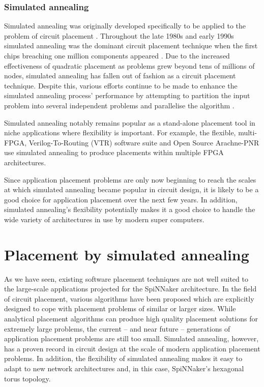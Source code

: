 			
			\subsubsection{Simulated annealing}
				
				Simulated annealing was originally developed specifically to be applied
				to the problem of circuit placement \cite{kirkpatrick83}. Throughout
				the late 1980s and early 1990s simulated annealing was the dominant
				circuit placement technique when the first chips breaching one million
				components appeared \cite{betz97,sechen85}. Due to the increased
				effectiveness of quadratic placement as problems grew beyond tens of
				millions of nodes, simulated annealing has fallen out of fashion as a
				circuit placement technique. Despite this, various efforts continue to
				be made to enhance the simulated annealing process' performance by
				attempting to partition the input problem into several independent
				problems \cite{choong10,haldar00} and parallelise the algorithm
				\cite{ludwin08}.
				
				Simulated annealing notably remains popular as a stand-alone placement
				tool in niche applications where flexibility is important. For example,
				the flexible, multi-FPGA, Verilog-To-Routing (VTR) software suite
				\cite{luu14} and Open Source Arachne-PNR \cite{cseed} use simulated
				annealing to produce placements within multiple FPGA architectures.
				
				Since application placement problems are only now beginning to reach
				the scales at which simulated annealing became popular in circuit
				design, it is likely to be a good choice for application placement over
				the next few years. In addition, simulated annealing's flexibility
				potentially makes it a good choice to handle the wide variety of
				architectures in use by modern super computers.
	
	\section{Placement by simulated annealing}
		
		\label{sec:placement-by-annealing}	
		
		As we have seen, existing software placement techniques are not well suited
		to the large-scale applications projected for the SpiNNaker architecture.
		In the field of circuit placement, various algorithms have been proposed
		which are explicitly designed to cope with placement problems of similar or
		larger sizes. While analytical placement algorithms can produce high
		quality placement solutions for extremely large problems, the current --
		and near future -- generations of application placement problems are still
		too small. Simulated annealing, however, has a proven record in circuit
		design at the scale of modern application placement problems. In addition,
		the flexibility of simulated annealing makes it easy to adapt to new
		network architectures and, in this case, SpiNNaker's hexagonal torus
		topology.
		
